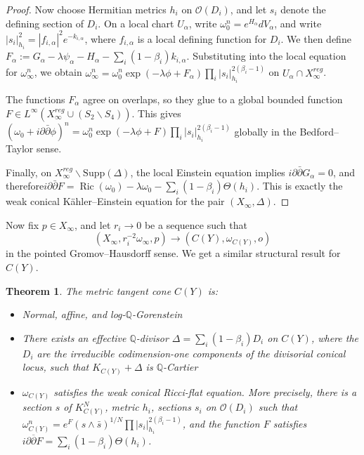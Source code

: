 \documentclass[11pt]{amsart}
\newtheorem{theorem}{Theorem}[section]
\theoremstyle{definition}
\theoremstyle{remark}
\begin{document}
\begin{proof}
Now choose Hermitian metrics $h_i$ on $\mathcal O(D_i)$, and let $s_i$ denote the defining section of $D_i$. On a local chart $U_\alpha$, write $\omega_0^n = e^{H_\alpha} dV_\alpha$, and write $|s_i|_{h_i}^2 = |f_{i,\alpha}|^2 e^{-k_{i,\alpha}}$, where $f_{i,\alpha}$ is a local defining function for $D_i$. We then define
$F_\alpha := G_\alpha - \lambda \psi_\alpha - H_\alpha - \sum_i (1-\beta_i)k_{i,\alpha}.$
Substituting into the local equation for $\omega_\infty^n$, we obtain $\omega_\infty^n = \omega_0^n \exp(-\lambda \phi + F_\alpha)\prod_i |s_i|_{h_i}^{2(\beta_i-1)}$ on $U_\alpha \cap X_\infty^{reg}$.

The functions $F_\alpha$ agree on overlaps, so they glue to a global bounded function $F \in L^\infty(X_\infty^{reg} \cup (S_2 \backslash S_4))$. This gives
$(\omega_0 + i \partial \bar{\partial}\phi)^n = \omega_0^n \exp(-\lambda \phi + F)\prod_i |s_i|_{h_i}^{2(\beta_i-1)}$
globally in the Bedford--Taylor sense. 

Finally, on $X_\infty^{reg} \backslash \mathrm{Supp}(\Delta)$, the local Einstein equation implies $i \partial \bar{\partial} G_\alpha = 0$, and therefore$i \partial \bar{\partial} F = \operatorname{Ric}(\omega_0) - \lambda \omega_0 - \sum_i (1-\beta_i)\Theta(h_i).$
This is exactly the weak conical K\"ahler--Einstein equation for the pair $(X_\infty,\Delta)$.
\end{proof}

Now fix $p\in X_\infty$, and let $r_i\to0$ be a sequence such that
\[
(X_\infty,r_i^{-2}\omega_\infty,p)
\longrightarrow
(C(Y),\omega_{C(Y)},o)
\]
in the pointed Gromov--Hausdorff sense. We get a similar structural result for $C(Y)$. 

\begin{theorem}
\label{thm:tangent-cone-log-structure}
The metric tangent cone $C(Y)$ is:
\begin{itemize}
    \item Normal, affine, and log-$\mathbb{Q}$-Gorenstein
    \item There exists an effective $\mathbb{Q}$-divisor $\Delta = \sum_i (1-\beta_i) D_i$ on $C(Y)$, where the $D_i$ are the irreducible codimension-one components of the divisorial conical locus, such that $K_{C(Y)} + \Delta$ is $\mathbb{Q}$-Cartier 
    \item $\omega_{C(Y)}$ satisfies the weak conical Ricci-flat equation. More precisely, there is a section $s$ of $K_{C(Y)}^N$, metric $h_i$, sections $s_i$ on $\mathcal O(D_i)$ such that $\omega_{C(Y)}^n = e^F(s \wedge \bar{s})^{1/N} \prod |s_i|_{h_i}^{2(\beta_i - 1)}$, and the function $F$ satisfies $i \partial \overline{\partial} F = \sum_i (1- \beta_i) \Theta(h_i)$.
\end{itemize}
\end{theorem}
\end{document}
